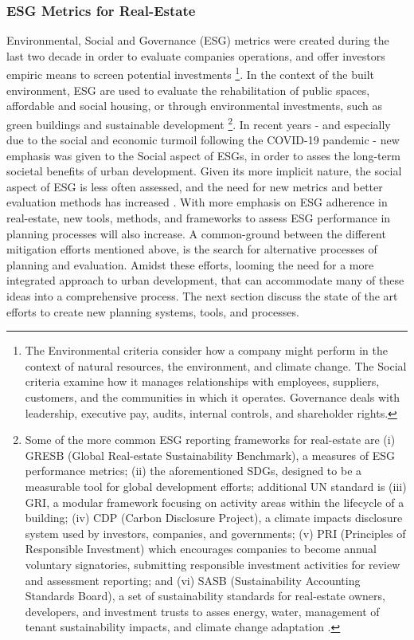 {{        \subsubsection{ESG Metrics for Real-Estate}
        {
            Environmental, Social and Governance (ESG) metrics were created during the last two decade in order to evaluate companies operations, and offer investors empiric means to screen potential investments \cite{friede2015esg}\footnote{The Environmental criteria consider how a company might perform in the context of natural resources, the environment, and climate change. The Social criteria examine how it manages relationships with employees, suppliers, customers, and the communities in which it operates. Governance deals with leadership, executive pay, audits, internal controls, and shareholder rights.}. In the context of the built environment, ESG are used to evaluate the rehabilitation of public spaces, affordable and social housing, or through environmental investments, such as green buildings and sustainable development \cite{deloitte_2021}\footnote{Some of the more common ESG reporting frameworks for real-estate are (i) GRESB (Global Real-estate Sustainability Benchmark), a measures of ESG performance metrics; (ii) the aforementioned SDGs, designed to be a measurable tool for global development efforts; additional UN standard is (iii) GRI, a modular framework focusing on activity areas within the lifecycle of a building; (iv) CDP (Carbon Disclosure Project), a climate impacts disclosure system used by investors, companies, and governments; (v) PRI (Principles of Responsible Investment) which encourages companies to become annual voluntary signatories, submitting responsible investment activities for review and assessment reporting; and (vi) SASB (Sustainability Accounting Standards Board), a set of sustainability standards for real-estate owners, developers, and investment trusts to asses energy, water, management of tenant sustainability impacts, and climate change adaptation \cite{swl2021}.}.
            In recent years - and especially due to the social and economic turmoil following the COVID-19 pandemic - new emphasis was given to the Social aspect of ESGs, in order to asses the long-term societal benefits of urban development. Given its more implicit nature, the social aspect of ESG is less often assessed, and the need for new metrics and better evaluation methods has increased \cite{swl2021}. With more emphasis on ESG adherence in real-estate, new tools, methods, and frameworks to assess ESG performance in planning processes will also increase.
        }
        \newline
        A common-ground between the different mitigation efforts mentioned above, is the search for alternative processes of planning and evaluation. Amidst these efforts, looming the need for a more integrated approach to urban development, that can accommodate many of these ideas into a comprehensive process. The next section discuss the state of the art efforts to create new planning systems, tools, and processes.
    }
}

